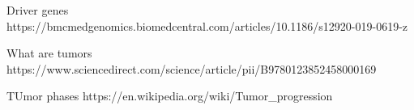 Driver genes
https://bmcmedgenomics.biomedcentral.com/articles/10.1186/s12920-019-0619-z

What are tumors
https://www.sciencedirect.com/science/article/pii/B9780123852458000169

TUmor phases
https://en.wikipedia.org/wiki/Tumor_progression